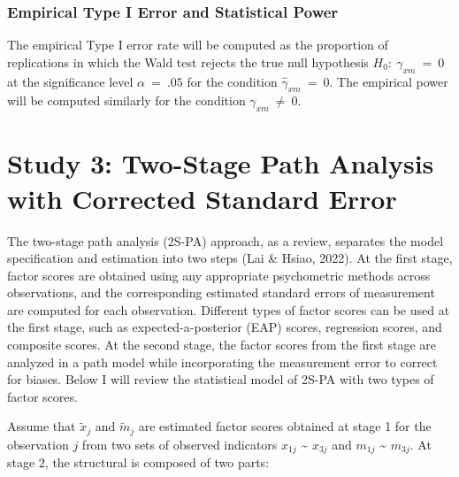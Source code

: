 \documentclass[
  man]{apa6}
\begin{document}
\hypertarget{empirical-type-i-error-and-statistical-power}{%
\subsubsection{Empirical Type I Error and Statistical Power}\label{empirical-type-i-error-and-statistical-power}}

The empirical Type I error rate will be computed as the proportion of replications in which the Wald test rejects the true null hypothesis \(H_{0}: \ \gamma_{xm} \ = \ 0\) at the significance level \(\alpha \ = \ .05\) for the condition \(\hat{\gamma}_{xm} \ = \ 0\). The empirical power will be computed similarly for the condition \(\gamma_{xm} \ \neq \ 0\).

\newpage

\hypertarget{study-3-two-stage-path-analysis-with-corrected-standard-error}{%
\section{Study 3: Two-Stage Path Analysis with Corrected Standard Error}\label{study-3-two-stage-path-analysis-with-corrected-standard-error}}

The two-stage path analysis (2S-PA) approach, as a review, separates the model specification and estimation into two steps (Lai \& Hsiao, 2022). At the first stage, factor scores are obtained using any appropriate psychometric methods across observations, and the corresponding estimated standard errors of measurement are computed for each observation. Different types of factor scores can be used at the first stage, such as expected-a-posterior (EAP) scores, regression scores, and composite scores. At the second stage, the factor scores from the first stage are analyzed in a path model while incorporating the measurement error to correct for biases. Below I will review the statistical model of 2S-PA with two types of factor scores.

Assume that \(\tilde{x}_{j}\) and \(\tilde{m}_{j}\) are estimated factor scores obtained at stage 1 for the observation \(j\) from two sets of observed indicators \(x_{1j}\) \textasciitilde{} \(x_{3j}\) and \(m_{1j}\) \textasciitilde{} \(m_{3j}\). At stage 2, the structural is composed of two parts:
\end{document}
